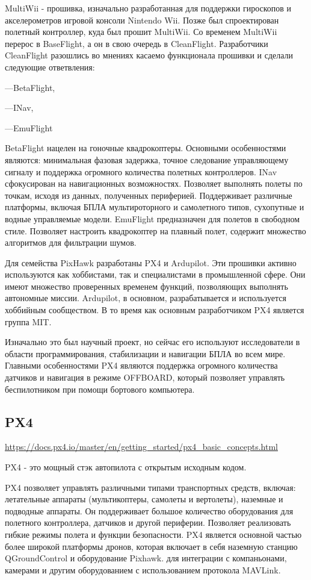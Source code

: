 MultiWii - прошивка, изначально разработанная для поддержки гироскопов и акселерометров игровой консоли Nintendo Wii. Позже был спроектирован полетный контроллер, куда был прошит MultiWii. Со временем MultiWii перерос в BaseFlight, а он в свою очередь в CleanFlight. Разработчики CleanFlight разошлись во мнениях касаемо функционала прошивки и сделали следующие ответвления:

---BetaFlight,

---INav,

---EmuFlight

BetaFlight нацелен на гоночные квадрокоптеры. Основными особенностями являются: минимальная фазовая задержка, точное следование управляющему сигналу и поддержка огромного количества полетных контроллеров.
INav сфокусирован на навигационных возможностях. Позволяет выполнять полеты по точкам, исходя из данных, полученных периферией. Поддерживает различные платформы, включая БПЛА мультироторного и самолетного типов, сухопутные и водные управляемые модели.
EmuFlight предназначен для полетов в свободном стиле. Позволяет настроить квадрокоптер на плавный полет, содержит множество алгоритмов для фильтрации шумов.

Для семейства PixHawk разработаны PX4 и Ardupilot. Эти прошивки активно используются как хоббистами, так и специалистами в промышленной сфере. Они имеют множество проверенных временем функций, позволяющих выполнять автономные миссии. Ardupilot, в основном, разрабатывается и используется хоббийным сообществом. В то время как основным разработчиком PX4 является группа MIT.

Изначально это был научный проект, но сейчас его используют исследователи в области программирования, стабилизации и навигации БПЛА во всем мире. Главными особенностями PX4 являются поддержка огромного количества датчиков и навигация в режиме OFFBOARD, который позволяет управлять беспилотником при помощи бортового компьютера.


\subsection{PX4}
\url{https://docs.px4.io/master/en/getting_started/px4_basic_concepts.html}

PX4 - это мощный стэк автопилота с открытым исходным кодом.

PX4 позволяет управлять различными типами транспортных средств, включая: летательные аппараты (мультикоптеры, самолеты и вертолеты), наземные и подводные аппараты. Он поддерживает большое количество оборудования для полетного контроллера, датчиков и другой периферии.
Позволяет реализовать гибкие режимы полета и функции безопасности.
PX4 является основной частью более широкой платформы дронов, которая включает в себя наземную станцию QGroundControl и оборудование Pixhawk. для интеграции с компаньонами, камерами и другим оборудованием с использованием протокола MAVLink. 

